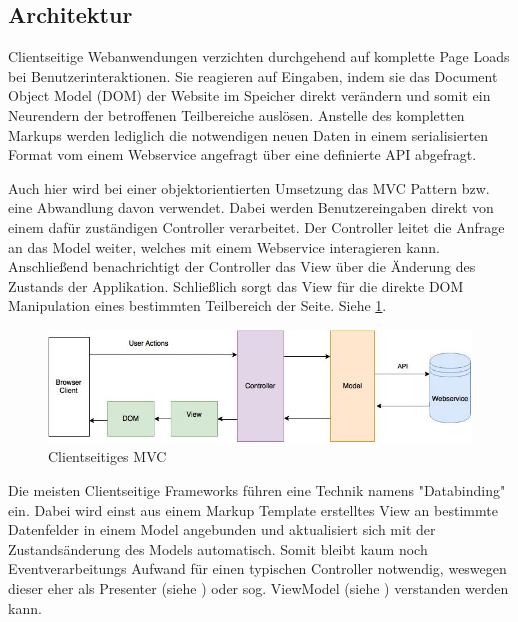 \subsection{Architektur}

Clientseitige Webanwendungen verzichten durchgehend auf komplette Page Loads bei Benutzerinteraktionen. Sie reagieren auf Eingaben, indem sie das Document Object Model (DOM) der Website im Speicher direkt verändern und somit ein Neurendern der betroffenen Teilbereiche auslösen. Anstelle des kompletten Markups werden lediglich die notwendigen neuen Daten in einem serialisierten Format vom einem Webservice angefragt über eine definierte API abgefragt. 

Auch hier wird bei einer objektorientierten Umsetzung das MVC Pattern bzw. eine Abwandlung davon verwendet. Dabei werden Benutzereingaben direkt von einem dafür zuständigen Controller verarbeitet. Der Controller leitet die Anfrage an das Model weiter, welches mit einem Webservice interagieren kann. Anschließend benachrichtigt der Controller das View über die Änderung des Zustands der Applikation. Schließlich sorgt das View für die direkte DOM Manipulation eines bestimmten Teilbereich der Seite.
Siehe \ref{fig:client_side_mvc}.

\begin{figure}[htp]     %
\centering
\includegraphics[width=1.0\textwidth]{images/client_side_mvc} 
\caption{Clientseitiges MVC}\label{fig:client_side_mvc}
\end{figure}

Die meisten Clientseitige Frameworks führen eine Technik namens "Databinding" ein. Dabei wird einst aus einem Markup Template erstelltes View an bestimmte Datenfelder in einem Model angebunden und aktualisiert sich mit der Zustandsänderung des Models automatisch. Somit bleibt kaum noch Eventverarbeitungs Aufwand für einen typischen Controller notwendig, weswegen dieser eher als Presenter (siehe \cite{MSDN:2016:MVP}) oder sog. ViewModel (siehe \cite{MSDN:2016:MVVM}) verstanden werden kann.


    



